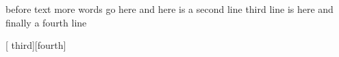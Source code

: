 before text more words go here
    and here is a second line
 third line is here
and finally a fourth line


[
third][fourth]
